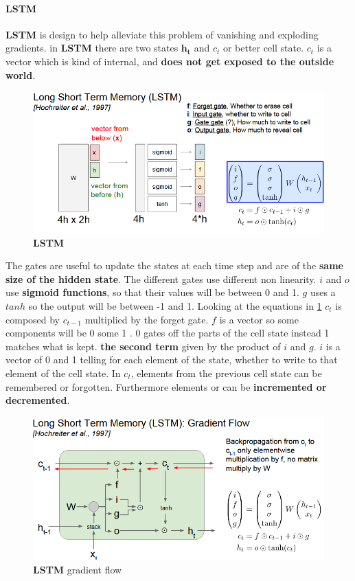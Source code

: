\documentclass[11pt]{article}
\begin{document}
\paragraph{LSTM}
\textbf{LSTM} is design to help alleviate this problem of vanishing and exploding gradients. in
\textbf{LSTM}  there are two states $\mathbf{h_t}$ and $c_t$ or better cell state. $c_t$ is a vector which is kind of internal, and \textbf{does not get exposed to the outside world}.
\begin{figure}[h]
\centering
\captionsetup{justification=centering}
\includegraphics[width=0.9\linewidth]{L923.pdf}
\caption{ \textbf{LSTM}}
\label{fig:L923}
\end{figure}
The gates are useful to update the states at each time step and are of the \textbf{same size of the hidden state}. The different gates use different non linearity. $i$ and $o$ use \textbf{sigmoid functions}, so that their values will be between 0 and 1. $g$ uses a $tanh$ so the output will be between -1 and 1. Looking at the equations in \ref{fig:L923} $c_t$ is composed by $c_{t-1}$  multiplied by the forget gate. $f$ is a vector so some components will be 0 some 1 .  0   gates off the parts of the cell state instead 1 matches what is kept. \textbf{the second term} given by the product of $i$  and $g$. $i$ is a vector of 0 and 1 telling for each element of the state, whether to write to that element of the cell state. In $c_t$, elements from the previous cell state can be remembered or forgotten. Furthermore elements  or can be \textbf{incremented or decremented}.
\begin{figure}[h]
\centering
\captionsetup{justification=centering}
\includegraphics[width=0.9\linewidth]{L924.pdf}
\caption{ \textbf{LSTM} gradient flow}
\label{fig:L924}
\end{figure}
\end{document}
